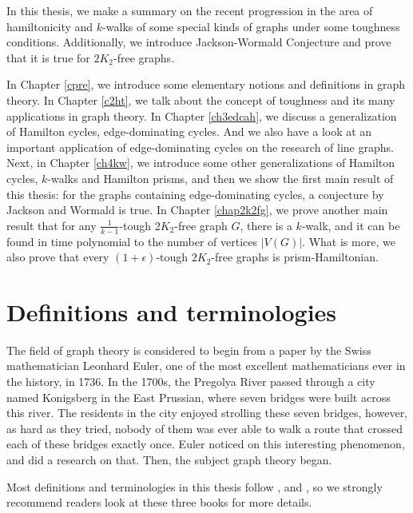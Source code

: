 \documentclass[12pt]{report}
\begin{document}
In this thesis, we make a summary on the recent progression in the area of hamiltonicity and $k$-walks of some special kinds of graphs under some toughness conditions. Additionally, we introduce  Jackson-Wormald Conjecture and prove that it is true for $2K_2$-free graphs.

In Chapter \ref{cpre}, we introduce some elementary notions and definitions in graph theory. In Chapter \ref{c2ht}, we talk about the concept of toughness and its many applications in graph theory. In Chapter \ref{ch3edcah}, we discuss a generalization of Hamilton cycles, edge-dominating cycles. And we also have a look at an important application of edge-dominating cycles on the research of line graphs. Next, in Chapter \ref{ch4kw}, we introduce some other generalizations of Hamilton cycles, $k$-walks and Hamilton prisms, and then we show the first main result of this thesis: for the graphs containing edge-dominating cycles, a conjecture by Jackson and Wormald is true. In Chapter \ref{chap2k2fg}, we prove another main result that for any $\frac{1}{k-1}$-tough $2K_2$-free graph $G$, there is a $k$-walk, and it can be found in time polynomial to the number of vertices $|V(G)|$. What is more, we also prove that every $(1+\epsilon)$-tough $2K_2$-free graphs is prism-Hamiltonian.

\section{Definitions and terminologies}
The field of graph theory is considered to begin from a paper \cite{euler1741solutio} by the Swiss mathematician Leonhard Euler, one of the most excellent mathematicians ever in the history, in 1736. In the 1700s, the Pregolya River passed through a city named Konigsberg in the East Prussian, where seven bridges were built across this river. The residents in the city enjoyed strolling these seven bridges, however, as hard as they tried, nobody of them was ever able to walk a route that crossed each of these bridges exactly once. Euler noticed on this interesting phenomenon, and did a research on that. Then, the subject graph theory began.



Most definitions and terminologies in this thesis follow \cite{harris2008combinatorics}, \cite{bomu08} and \cite{diestel2000graph}, so we strongly recommend readers look at these three books for more details.
\end{document}
